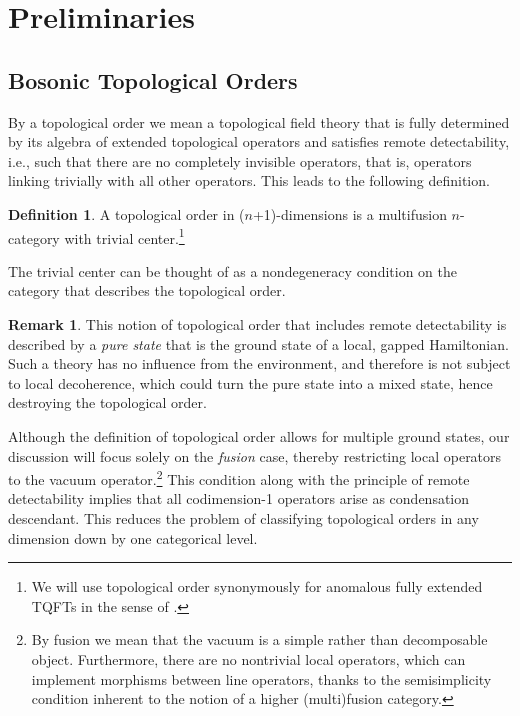 \documentclass[11pt,reqno]{amsart}
\numberwithin{equation}{section}
\theoremstyle{plain}
\theoremstyle{definition}
\newtheorem{defn}[equation]{Definition}
\newtheorem{rem}[equation]{Remark}
\begin{document}
\section{Preliminaries}\label{section:prelim}

\subsection{Bosonic Topological Orders}\label{subsection:BTQFT}
By a topological order we mean a topological field theory that is fully determined by its algebra of extended topological operators and satisfies remote detectability, i.e., such that there are no completely invisible operators, that is, operators linking trivially with all other operators. This leads to the following definition.
\begin{defn}\cite[Definition I.1]{JF}\label{def:toporder}
     A topological order in ($n$+1)-dimensions is a multifusion $n$-category with trivial center.\footnote{We will use topological order synonymously for anomalous fully extended TQFTs in the sense of \cite{Freed:2012bs}.}
\end{defn}
The trivial center can be thought of as a nondegeneracy condition on the category that describes the topological order. 

\begin{rem}
    This notion of topological order that includes remote detectability is described by a \textit{pure state} that is the ground state of a local, gapped Hamiltonian. Such a theory has no influence from the environment, and therefore is not subject to local decoherence, which could turn the pure state into a mixed state, hence destroying the topological order.
\end{rem}

Although the definition of topological order allows for multiple ground states, our discussion will focus solely on the \textit{fusion} case, thereby restricting local operators to the vacuum operator.\footnote{By fusion we mean that the vacuum is a simple rather than decomposable object. Furthermore, there are no nontrivial local operators, which can implement morphisms between line operators, thanks to the semisimplicity condition inherent to the notion of a higher (multi)fusion category.} This condition along with the principle of remote detectability implies that all codimension-1 operators arise as condensation descendant. This reduces the problem of classifying topological orders in any dimension down by one categorical level.
\end{document}
